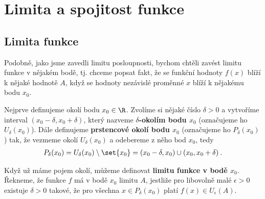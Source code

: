 \section*{Limita a spojitost funkce}

\subsection*{Limita funkce}

Podobně, jako jsme zavedli limitu posloupnosti, bychom chtěli zavést limitu funkce v nějakém bodě, tj. chceme popsat fakt, že se funkční hodnoty $f(x)$ blíží k nějaké hodnotě $A$, když se hodnoty nezávislé proměnné $x$ blíží k nějakému bodu $x_0$.

Nejprve definujeme okolí bodu $x_0 \in \R$. Zvolíme si nějaké číslo $\delta > 0$ a vytvoříme interval $(x_0-\delta, x_0 + \delta)$, který nazveme \textbf{$\delta$-okolím bodu $x_0$} (označujeme ho $U_\delta(x_0)$). Dále definujeme \textbf{prstencové okolí bodu $x_0$} (označujeme ho $P_\delta(x_0)$) tak, že vezmeme okolí $U_\delta(x_0)$ a odebereme z něho bod $x_0$, tedy
\begin{align}
    P_\delta(x_0) = U_\delta(x_0) \setminus \set{x_0} = (x_0 - \delta, x_0) \cup (x_0, x_0 + \delta) \:. 
\end{align}

Když už máme pojem okolí, můžeme definovat \textbf{limitu funkce v bodě $x_0$}. Řekneme, že funkce $f$ má v bodě $x_0$ limitu $A$, jestliže pro libovolně malé $\epsilon >0$ existuje $\delta > 0$ takové, že pro všechna $x \in P_\delta (x_0)$ platí $f(x) \in U_\epsilon(A)$.

